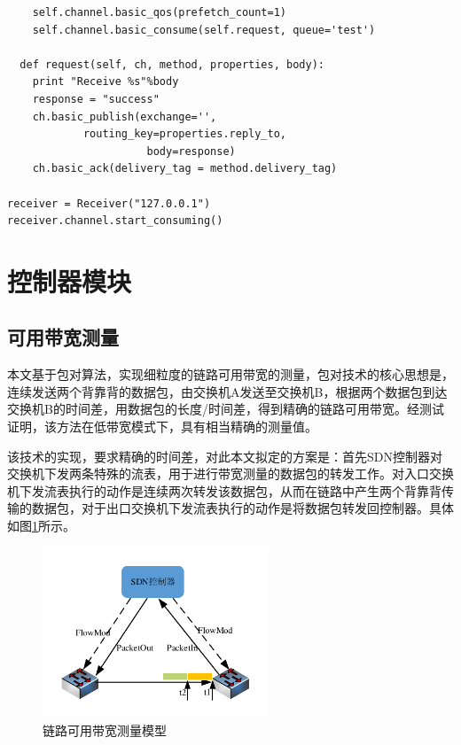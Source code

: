 \begin{verbatim} 
    self.channel.basic_qos(prefetch_count=1)
    self.channel.basic_consume(self.request, queue='test')

  def request(self, ch, method, properties, body):
    print "Receive %s"%body
    response = "success"
    ch.basic_publish(exchange='',
            routing_key=properties.reply_to,
                      body=response)
    ch.basic_ack(delivery_tag = method.delivery_tag)

receiver = Receiver("127.0.0.1")
receiver.channel.start_consuming()

\end{verbatim}

\section{控制器模块}
\subsection{可用带宽测量}
本文基于包对算法，实现细粒度的链路可用带宽的测量，包对技术的核心思想是，连续发送两个背靠背的数据包，由交换机A发送至交换机B，根据两个数据包到达交换机B的时间差，用数据包的长度/时间差，得到精确的链路可用带宽。经测试证明，该方法在低带宽模式下，具有相当精确的测量值。

该技术的实现，要求精确的时间差，对此本文拟定的方案是：首先SDN控制器对交换机下发两条特殊的流表，用于进行带宽测量的数据包的转发工作。对入口交换机下发流表执行的动作是连续两次转发该数据包，从而在链路中产生两个背靠背传输的数据包，对于出口交换机下发流表执行的动作是将数据包转发回控制器。具体如图\ref{fig:spaceband}所示。

\begin{figure}[!htb]
  \centering
  \includegraphics[width=0.6\textwidth]{logo/spaceband}
  \caption{链路可用带宽测量模型}
  \label{fig:spaceband}
\end{figure}

